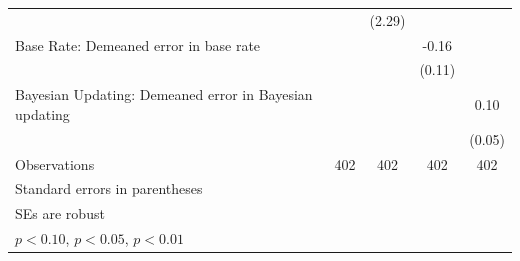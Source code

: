 \begin{table}[htbp]
\begin{tabular}{l*{4}{c}}
                &                  &   (2.29)         &                  &                  \\
Base Rate: Demeaned error in base rate&                  &                  &    -0.16         &                  \\
                &                  &                  &   (0.11)         &                  \\
Bayesian Updating: Demeaned error in Bayesian updating&                  &                  &                  &     0.10\sym{**} \\
                &                  &                  &                  &   (0.05)         \\
\hline
Observations    &      402         &      402         &      402         &      402         \\
\hline\hline
\multicolumn{5}{l}{\footnotesize Standard errors in parentheses}\\
\multicolumn{5}{l}{\footnotesize SEs are robust}\\
\multicolumn{5}{l}{\footnotesize \sym{*} \(p<0.10\), \sym{**} \(p<0.05\), \sym{***} \(p<0.01\)}\\
\end{tabular}
\end{table}
